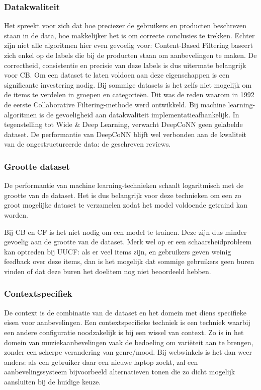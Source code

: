 \subsubsection{Datakwaliteit}
Het spreekt voor zich dat hoe preciezer de gebruikers en producten beschreven staan in de data, hoe makkelijker het is om correcte conclusies te trekken. Echter zijn niet alle algoritmen hier even gevoelig voor: Content-Based Filtering baseert zich enkel op de labels die bij de producten staan om aanbevelingen te maken. De correctheid, consistentie en precisie van deze labels is dus uitermate belangrijk voor CB. Om een dataset te laten voldoen aan deze eigenschappen is een significante investering nodig. Bij sommige datasets is het zelfs niet mogelijk om de items te verdelen in groepen en categorieën. Dit was de reden waarom in 1992 de eerste Collaborative Filtering-methode werd ontwikkeld. \cite{UUCF_original_paper} Bij machine learning-algoritmen is de gevoeligheid aan datakwaliteit implementatieafhankelijk. In tegenstelling tot Wide \& Deep Learning, verwacht DeepCoNN geen gelabelde dataset. De performantie van DeepCoNN blijft wel verbonden aan de kwaliteit van de ongestructureerde data: de geschreven reviews.
\subsubsection{Grootte dataset}
De performantie van machine learning-technieken schaalt logaritmisch met de grootte van de dataset. \cite{dataset_size_for_deep_learning} Het is dus belangrijk voor deze technieken om een zo groot mogelijke dataset te verzamelen zodat het model voldoende getraind kan worden.

Bij CB en CF is het niet nodig om een model te trainen. Deze zijn dus minder gevoelig aan de grootte van de dataset. Merk wel op er een schaarsheidprobleem kan optreden bij UUCF: als er veel items zijn, en gebruikers geven weinig feedback over deze items, dan is het mogelijk dat sommige gebruikers geen buren vinden of dat deze buren het doelitem nog niet beoordeeld hebben. \cite{cursus_hs9}
\subsubsection{Contextspecifiek}
De context is de combinatie van de dataset en het domein met diens specifieke eisen voor aanbevelingen. Een contextspecifieke techniek is een techniek waarbij een andere configuratie noodzakelijk is bij een wissel van context. Zo is in het domein van muziekaanbevelingen vaak de bedoeling om variëteit aan te brengen, zonder een scherpe verandering van genre/mood. Bij webwinkels is het dan weer anders: als een gebruiker daar een nieuwe laptop zoekt, zal een aanbevelingssysteem bijvoorbeeld alternatieven tonen die zo dicht mogelijk aansluiten bij de huidige keuze.

